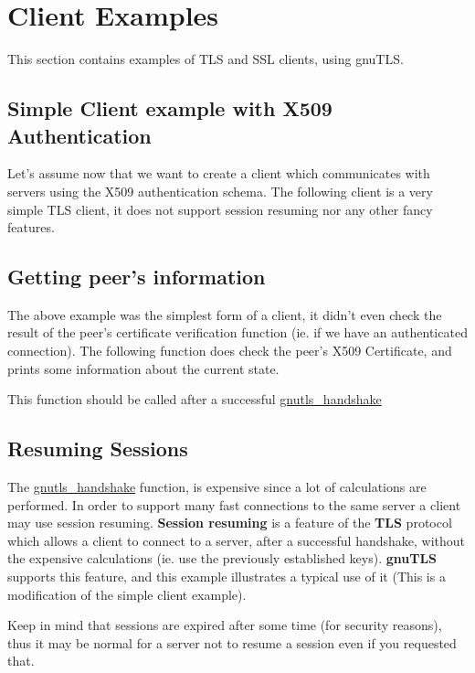 \documentclass{article}
\begin{document}
\section{Client Examples}
This section contains examples of TLS and SSL clients, using gnuTLS. 

\subsection{Simple Client example with X509 Authentication}
Let's assume now that we want to create a client which communicates
with servers using the X509 authentication schema. The following client
is a very simple TLS client, it does not support session resuming nor
any other fancy features.


\subsection{Getting peer's information}
\par The above example was the simplest form of a client, it didn't even check
the result of the peer's certificate verification function (ie. if we have
an authenticated connection). The following function does check the peer's X509
Certificate, and prints some information about the current state.
\par
This function should be called after a successful
\hyperref{gnutls\_handshake()}{gnutls\_handshake() (see Section }{ for more information)}{gnutls_handshake}



\subsection{Resuming Sessions}
\par
The 
\hyperref{gnutls\_handshake()}{gnutls\_handshake() (see Section }{ for more information)}{gnutls_handshake}
 function, is expensive since
a lot of calculations are performed. In order to support many fast connections to
the same server a client may use session resuming. {\bf Session resuming} is a
feature of the {\bf TLS} protocol which allows a client to connect to a server,
after a successful handshake, without the expensive calculations (ie. use the previously
established keys). {\bf gnuTLS} supports this feature, and this example illustrates a
typical use of it (This is a modification of the simple client example).

\par
Keep in mind that sessions are expired after some time (for security reasons), thus
it may be normal for a server not to resume a session even if you requested that.
\end{document}
